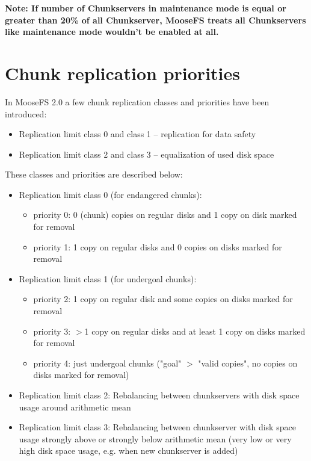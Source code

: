 \documentclass[a4paper,11pt,english]{report}
\begin{document}
		\bigskip

		\textbf{Note: If number of Chunkservers in maintenance mode is equal or greater than 20\% of all Chunkserver, MooseFS treats all Chunkservers like maintenance mode wouldn't be enabled at all.}
		
		\section{Chunk replication priorities}
		In MooseFS 2.0 a few chunk replication classes and priorities have been introduced:
		\begin{itemize}
			\item Replication limit class 0 and class 1 -- replication for data safety
			\item Replication limit class 2 and class 3 -- equalization of used disk space
		\end{itemize}
		
		\bigskip
		\bigskip
		These classes and priorities are described below:		
		\bigskip		
		
		\begin{itemize}
			\item Replication limit class 0 (for endangered chunks):
				\begin{itemize}
					\item priority 0: 0 (chunk) copies on regular disks and 1 copy on disk marked for removal
					\item priority 1: 1 copy on regular disks and 0 copies on disks marked for removal
				\end{itemize}
				
			\item Replication limit class 1 (for undergoal chunks):
				\begin{itemize}
					\item priority 2: 1 copy on regular disk and some copies on disks marked for removal
					\item priority 3: $>$1 copy on regular disks and at least 1 copy on disks marked for removal
					\item priority 4: just undergoal chunks ("goal" $>$ "valid copies", no copies on disks marked for removal)
				\end{itemize}
				
			\item Replication limit class 2: Rebalancing between chunkservers with disk space usage around arithmetic mean
			\item Replication limit class 3: Rebalancing between chunkserver with disk space usage strongly above or strongly below arithmetic mean (very low or very high disk space usage, e.g. when new chunkserver is added)
		\end{itemize}
		
\end{document}
